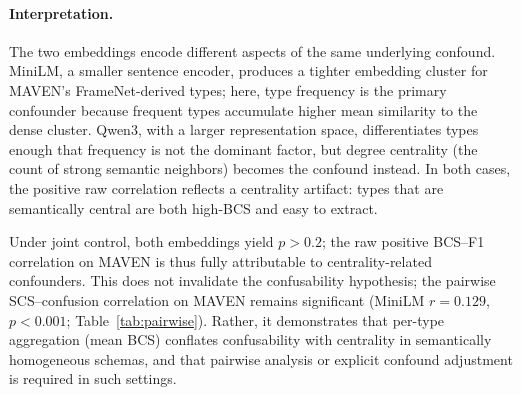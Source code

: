 \documentclass[11pt]{article}
\begin{document}
\begin{table}[h]
\centering
\small
\caption{MAVEN per-type BCS--F1 correlation before and after controlling for centrality confounders. Raw correlations are Spearman $\rho$; partial correlations are Pearson $r$ from residualized regression. Degree centrality is computed on the SCS graph at threshold 0.7. All values from the residualized BCS analysis.}
\label{tab:residualized_bcs}
\end{table}

\paragraph{Interpretation.}
The two embeddings encode different aspects of the same underlying confound. MiniLM, a smaller sentence encoder, produces a tighter embedding cluster for MAVEN's FrameNet-derived types; here, type frequency is the primary confounder because frequent types accumulate higher mean similarity to the dense cluster. Qwen3, with a larger representation space, differentiates types enough that frequency is not the dominant factor, but degree centrality (the count of strong semantic neighbors) becomes the confound instead. In both cases, the positive raw correlation reflects a centrality artifact: types that are semantically central are both high-BCS and easy to extract.

Under joint control, both embeddings yield $p > 0.2$; the raw positive BCS--F1 correlation on MAVEN is thus fully attributable to centrality-related confounders. This does not invalidate the confusability hypothesis; the pairwise SCS--confusion correlation on MAVEN remains significant (MiniLM $r = 0.129$, $p < 0.001$; Table~\ref{tab:pairwise}). Rather, it demonstrates that per-type aggregation (mean BCS) conflates confusability with centrality in semantically homogeneous schemas, and that pairwise analysis or explicit confound adjustment is required in such settings.
\end{document}
